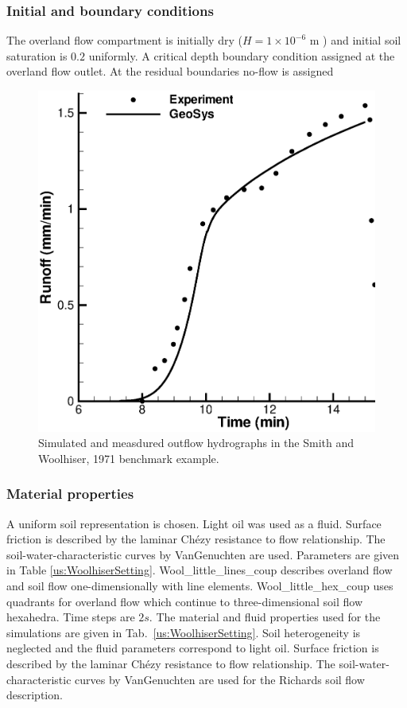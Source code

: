 \subsubsection*{Initial and boundary conditions}
%
The overland flow compartment is initially dry ($H=1\times 10^{-6}$ m ) and initial soil saturation is $0.2$ uniformly.
A critical depth boundary condition assigned at the overland flow outlet.
At the residual boundaries no-flow is assigned
%
\begin{figure} [h!]
 \centering
\includegraphics[width=0.75\columnwidth] {H_COUP/figures/woolhiserResults.eps}
\caption{Simulated and measdured outflow hydrographs in the Smith and Woolhiser, 1971 \cite{Smith:71} benchmark example.}
 \label{coup:woolhiserResults}
\end{figure}
%
\subsubsection*{Material properties}
%
A uniform soil representation is chosen. Light oil was used as a fluid. Surface friction is described by
the laminar Ch\'{e}zy resistance to flow relationship. The soil-water-characteristic curves by
VanGenuchten are used.
Parameters are given in Table \ref{us:WoolhiserSetting}.
Wool\_little\_lines\_coup describes overland flow and soil flow one-dimensionally with line elements.
Wool\_little\_hex\_coup uses quadrants for overland flow which continue to three-dimensional soil flow hexahedra.
Time steps are $2s$.
The material and fluid properties used for the simulations are given in Tab.~\ref{us:WoolhiserSetting}.
Soil heterogeneity is neglected and the fluid parameters correspond to light oil. Surface friction is described by
the laminar Ch\'{e}zy resistance to flow relationship. The soil-water-characteristic curves by
VanGenuchten are used for the Richards soil flow description.
%


